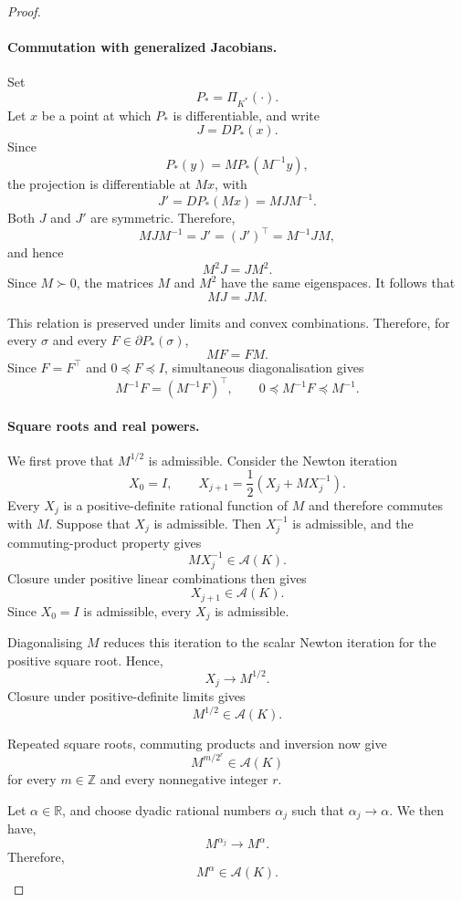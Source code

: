 \documentclass[a4paper,11pt]{book}
\theoremstyle{plain}
\theoremstyle{definition}
\theoremstyle{remark}
\numberwithin{equation}{chapter}
\numberwithin{algorithm}{chapter}
\newcommand{\proj}[2]{\Pi_{#2}\!\left(#1\right)}
\begin{document}
\begin{proof}
		\paragraph{Commutation with generalized Jacobians.}
		Set
		\[
		P_*=\proj{\cdot}{K^*}.
		\]
		Let $x$ be a point at which $P_*$ is differentiable, and write
		\[
		J=DP_*(x).
		\]
		Since
		\[
		P_*(y)=MP_*(M^{-1}y),
		\]
		the projection is differentiable at $Mx$, with
		\[
		J'=DP_*(Mx)=MJM^{-1}.
		\]
		Both $J$ and $J'$ are symmetric. Therefore,
		\[
		MJM^{-1}
		=
		J'
		=
		(J')^\top
		=
		M^{-1}JM,
		\]
		and hence
		\[
		M^2J=JM^2.
		\]
		Since $M\succ0$, the matrices $M$ and $M^2$ have the same eigenspaces. It
		follows that
		\[
		MJ=JM.
		\]
		
		This relation is preserved under limits and convex combinations. Therefore,
		for every $\sigma$ and every
		$F\in\partial P_*(\sigma)$,
		\[
		MF=FM.
		\]
		Since $F=F^\top$ and $0\preceq F\preceq I$, simultaneous diagonalisation gives
		\[
		M^{-1}F=(M^{-1}F)^\top,
		\qquad
		0\preceq M^{-1}F\preceq M^{-1}.
		\]
		
		\paragraph{Square roots and real powers.}
		We first prove that $M^{1/2}$ is admissible. Consider the Newton iteration
		\[
		X_0=I,
		\qquad
		X_{j+1}
		=
		\frac12\left(X_j+MX_j^{-1}\right).
		\]
		Every $X_j$ is a positive-definite rational function of $M$ and therefore
		commutes with $M$. Suppose that $X_j$ is admissible. Then $X_j^{-1}$ is
		admissible, and the commuting-product property gives
		\[
		MX_j^{-1}\in\mathcal A(K).
		\]
		Closure under positive linear combinations then gives
		\[
		X_{j+1}\in\mathcal A(K).
		\]
		Since $X_0=I$ is admissible, every $X_j$ is admissible.
		
		Diagonalising $M$ reduces this iteration to the scalar Newton iteration for
		the positive square root. Hence,
		\[
		X_j\longrightarrow M^{1/2}.
		\]
		Closure under positive-definite limits gives
		\[
		M^{1/2}\in\mathcal A(K).
		\]
		
		Repeated square roots, commuting products and inversion now give
		\[
		M^{m/2^r}\in\mathcal A(K)
		\]
		for every $m\in\mathbb Z$ and every nonnegative integer $r$.
		
		Let $\alpha\in\mathbb R$, and choose dyadic rational numbers $\alpha_j$ such
		that $\alpha_j\to\alpha$. We then have,
		\[
		M^{\alpha_j}\longrightarrow M^\alpha.
		\]
		Therefore,
		\[
		M^\alpha\in\mathcal A(K).
		\]
		
	\end{proof}
	
\end{document}
